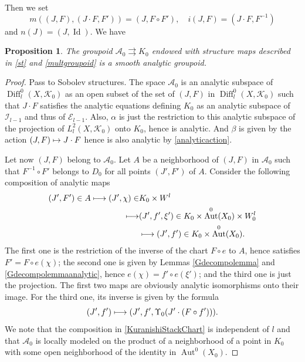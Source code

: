 \documentclass[10pt]{amsart}
\let\mathcal\mathscr
\def\mto{\mathchoice{\longmapsto}{\mapsto}{\mapsto}{\mapsto}}
\DeclareMathOperator{\Aut}{Aut}
\DeclareMathOperator{\Diff}{Diff}
\DeclareMathOperator{\Id}{Id}
\theoremstyle{plain}
\newtheorem{proposition}[theorem]{Proposition}
\theoremstyle{definition}
\theoremstyle{remark}
\numberwithin{equation}{section}
\newcommand{\Azero}{\Aut^0(X_0)}
\newcommand{\DlKz}{\Diff^0_l(X,\mathcal K_0)}
\newcommand{\cI}{\mathcal{I}}
\begin{document}
Then we set
\begin{equation}
\label{multgroupoid}
m((J,F),(J\cdot F, F'))=(J,F\circ F'),\quad i(J,F)=(J\cdot F, F^{-1})
\end{equation}
and $n(J)=(J,\Id)$.
We have
\begin{proposition}
\label{analyticKurstack}
The groupoid $\mathcal A_0\rightrightarrows K_0$ endowed with structure maps described in \eqref{st} and \eqref{multgroupoid} is a smooth analytic groupoid.
\end{proposition}
\begin{proof}
Pass to Sobolev structures. The space $\mathcal A_0$ is an analytic subspace of $\DlKz$ as an open subset of the set of $(J,F)$ in $\DlKz$ such that $J\cdot F$ satisfies the analytic equations defining $K_0$ as an analytic subspace of $\cI_{l-1}$ and thus of $\mathcal E_{l-1}$. Also, $\alpha$ is just the restriction to this analytic subspace of the projection of $L^2_l(X,\mathcal K_0)$ onto $K_0$, hence is analytic. And $\beta$ is given by the action $(J,F)\mto J\cdot F$ hence is also analytic by \eqref{analyticaction}.

Let now $(J,F)$ belong to $\mathcal A_0$. Let $A$ be a neighborhood of $(J,F)$ in $\mathcal A_0$ such that $F^{-1}\circ F'$ belongs to $D_0$ for all points $(J',F')$ of $A$. Consider the following composition of analytic maps
\begin{equation}
\label{KuranishiStackChart}
\begin{split}
(J',F')\in A\mto (J',\chi)\in &K_0\times W^l\\\mto &(J',f',\xi')\in K_0\times \Azero\times W_0^l\\&\mto (J',f')\in K_0\times\Azero.
\end{split}
\end{equation}
The first one is the restriction of the inverse of the chart $F\circ e$ to $A$, hence satisfies $F'=F\circ e(\chi)$; the second one is given by Lemmas \ref{Gdecompolemma} and \ref{Gdecompolemmaanalytic}, hence $e(\chi)=f'\circ e(\xi')$; and the third one is just the projection. The first two maps are obviously analytic isomorphisms onto their image. For the third one, its inverse is given by the formula
\begin{equation}
\label{inverseKuranishiStackChart}
(J',f')\mto (J',f',\Upsilon_0(J'\cdot (F\circ f'))).
\end{equation}
We note that the composition in \eqref{KuranishiStackChart} is independent of $l$ and that $\mathcal A_0$ is locally modeled on the product of a neighborhood of a point in $K_0$ with some open neighborhood of the identity in $\Azero$.


\end{proof}
\end{document}
